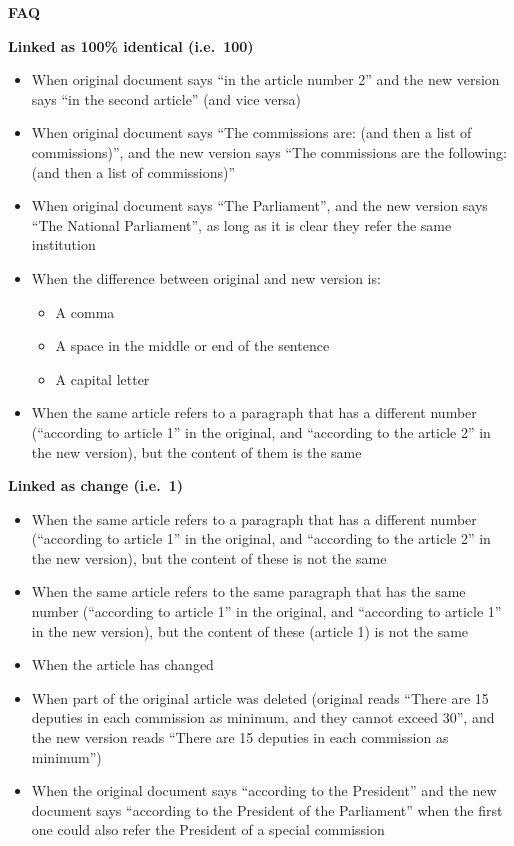 \documentclass[10pt,]{article}
\providecommand{\tightlist}{%
  \setlength{\itemsep}{0pt}\setlength{\parskip}{0pt}}
\begin{document}
\textbf{FAQ}

\textbf{Linked as 100\% identical (i.e.~100)}

\begin{itemize}
\tightlist
\item
  When original document says ``in the article number 2'' and the new
  version says ``in the second article'' (and vice versa)
\item
  When original document says ``The commissions are: (and then a list of
  commissions)'', and the new version says ``The commissions are the
  following: (and then a list of commissions)''
\item
  When original document says ``The Parliament'', and the new version
  says ``The National Parliament'', as long as it is clear they refer
  the same institution
\item
  When the difference between original and new version is:

  \begin{itemize}
  \tightlist
  \item
    A comma
  \item
    A space in the middle or end of the sentence
  \item
    A capital letter
  \end{itemize}
\item
  When the same article refers to a paragraph that has a different
  number (``according to article 1'' in the original, and ``according to
  the article 2'' in the new version), but the content of them is the
  same
\end{itemize}

\textbf{Linked as change (i.e.~1)}

\begin{itemize}
\tightlist
\item
  When the same article refers to a paragraph that has a different
  number (``according to article 1'' in the original, and ``according to
  the article 2'' in the new version), but the content of these is not
  the same
\item
  When the same article refers to the same paragraph that has the same
  number (``according to article 1'' in the original, and ``according to
  article 1'' in the new version), but the content of these (article 1)
  is not the same
\item
  When the article has changed
\item
  When part of the original article was deleted (original reads ``There
  are 15 deputies in each commission as minimum, and they cannot exceed
  30'', and the new version reads ``There are 15 deputies in each
  commission as minimum'')
\item
  When the original document says ``according to the President'' and the
  new document says ``according to the President of the Parliament''
  when the first one could also refer the President of a special
  commission
\end{itemize}
\end{document}
